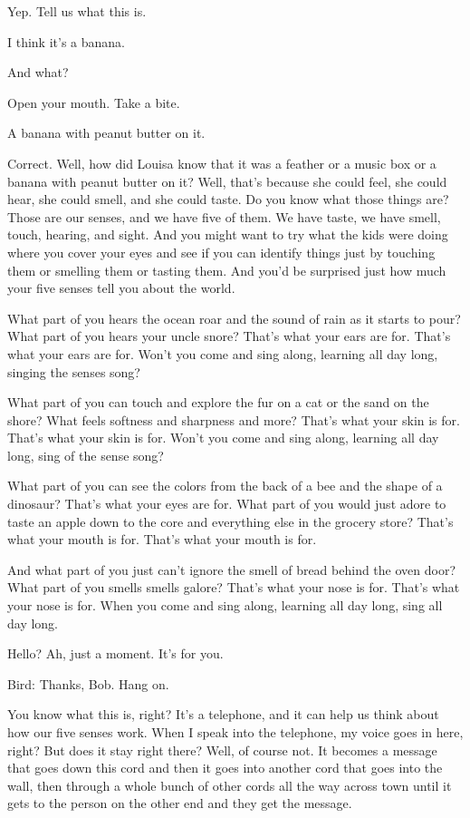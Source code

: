 Yep. Tell us what this is.

I think it's a banana.

And what?

Open your mouth. Take a bite.

A banana with peanut butter on it.

Correct. Well, how did Louisa know that it was a feather or a music box or a banana with peanut butter on it? Well, that's because she could feel, she could hear, she could smell, and she could taste. Do you know what those things are? Those are our senses, and we have five of them. We have taste, we have smell, touch, hearing, and sight. And you might want to try what the kids were doing where you cover your eyes and see if you can identify things just by touching them or smelling them or tasting them. And you'd be surprised just how much your five senses tell you about the world.

What part of you hears the ocean roar and the sound of rain as it starts to pour? What part of you hears your uncle snore? That's what your ears are for. That's what your ears are for. Won't you come and sing along, learning all day long, singing the senses song?

What part of you can touch and explore the fur on a cat or the sand on the shore? What feels softness and sharpness and more? That's what your skin is for. That's what your skin is for. Won't you come and sing along, learning all day long, sing of the sense song?

What part of you can see the colors from the back of a bee and the shape of a dinosaur? That's what your eyes are for. What part of you would just adore to taste an apple down to the core and everything else in the grocery store? That's what your mouth is for. That's what your mouth is for.

And what part of you just can't ignore the smell of bread behind the oven door? What part of you smells smells galore? That's what your nose is for. That's what your nose is for. When you come and sing along, learning all day long, sing all day long.

Hello? Ah, just a moment. It's for you.

Bird: Thanks, Bob. Hang on.

You know what this is, right? It's a telephone, and it can help us think about how our five senses work. When I speak into the telephone, my voice goes in here, right? But does it stay right there? Well, of course not. It becomes a message that goes down this cord and then it goes into another cord that goes into the wall, then through a whole bunch of other cords all the way across town until it gets to the person on the other end and they get the message.

